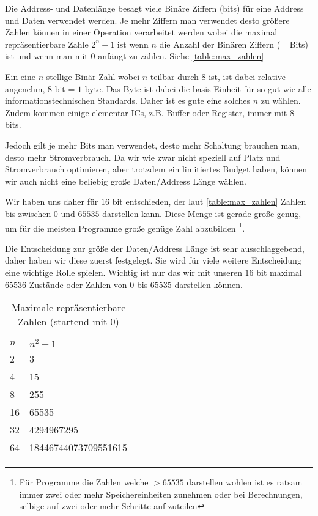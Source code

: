 \documentclass{scrartcl}
\begin{document}
Die Address- und Datenlänge besagt viele Binäre Ziffern (bits) für eine Address und Daten verwendet werden.
Je mehr Ziffern man verwendet desto größere Zahlen können in einer Operation verarbeitet werden wobei die maximal repräsentierbare Zahle $2^n - 1$ ist wenn $n$ die Anzahl der Binären Ziffern (= Bits) ist und wenn man mit $0$ anfängt zu zählen.
Siehe \autoref{table:max_zahlen}

Ein eine $n$ stellige Binär Zahl wobei $n$ teilbar durch $8$ ist, ist dabei relative angenehm, $8$ bit = $1$ byte.
Das Byte ist dabei die basis Einheit für so gut wie alle informationstechnischen Standards.
Daher ist es gute eine solches $n$ zu wählen.
Zudem kommen einige elementar ICs, z.B. Buffer oder Register, immer mit 8 bits.

Jedoch gilt je mehr Bits man verwendet, desto mehr Schaltung brauchen man, desto mehr Stromverbrauch.
Da wir wie zwar nicht speziell auf Platz und Stromverbrauch optimieren, aber trotzdem ein limitiertes Budget haben, können wir auch nicht eine beliebig große Daten/Address Länge wählen.

Wir haben uns daher für $16$ bit entschieden, der laut \autoref{table:max_zahlen} Zahlen bis zwischen $0$ und $65535$ darstellen kann.
Diese Menge ist gerade große genug, um für die meisten Programme große genüge Zahl abzubilden
\footnote{Für Programme die Zahlen welche $> 65535$ darstellen wohlen ist es ratsam immer zwei oder mehr Speichereinheiten zunehmen oder bei Berechnungen, selbige auf zwei oder mehr Schritte auf zuteilen}.

Die Entscheidung zur größe der Daten/Address Länge ist sehr ausschlaggebend, daher haben wir diese zuerst festgelegt.
Sie wird für viele weitere Entscheidung eine wichtige Rolle spielen.
Wichtig ist nur das wir mit unseren $16$ bit maximal $65536$ Zustände oder Zahlen von $0$ bis $65535$ darstellen können.

\begin{center}
	\begin{table}[h]
		\caption{\label{table:max_zahlen} Maximale repräsentierbare Zahlen (startend mit 0)}
		\begin{tabular}{ l | l }
 		$n$ & $n^2 - 1$ \\
		\hline 
		2 & 3\\  
		4 & 15\\
		8 & 255\\
		16 & 65535\\
 		32 & 4294967295\\
 		64 & 18446744073709551615\\
		\end{tabular}
	\end{table}
\end{center}
\end{document}
